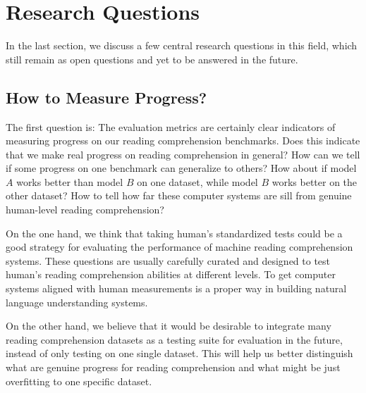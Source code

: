 
\section{Research Questions}
\label{sec:research-questions}

In the last section, we discuss a few central research questions in this field, which still remain as open questions and yet to be answered in the future.

\subsection{How to Measure Progress?}
The first question is:  The evaluation metrics are certainly clear indicators of measuring progress on our reading comprehension benchmarks. Does this indicate that we make real progress on reading comprehension in general? How can we tell if some progress on one benchmark can generalize to others? How about if model $A$ works better than model $B$ on one dataset, while model $B$ works better on the other dataset? How to tell how far these computer systems are sill from genuine human-level reading comprehension?

On the one hand, we think that taking human's standardized tests could be a good strategy for evaluating the performance of machine reading comprehension systems. These questions are usually carefully curated and designed to test human's reading comprehension abilities at different levels. To get computer systems aligned with human measurements is a proper way in building natural language understanding systems.

On the other hand, we believe that it would be desirable to integrate many reading comprehension datasets as a testing suite for evaluation in the future, instead of only testing on one single dataset. This will help us better distinguish what are genuine progress for reading comprehension and what might be just overfitting to one specific dataset.

